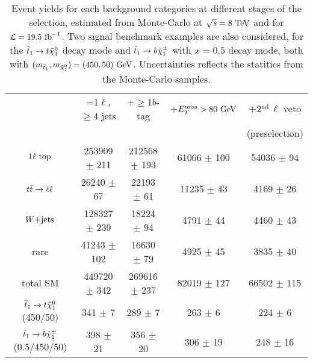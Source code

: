         \begin{table}[h!]
            \hspace*{-0.3cm}
            \begin{tabular}{|c|cccc|}
                \hline
                                             & =1$\ell$, $\geq 4$ jets   & +$\geq 1b$-tag     & +$E_T^\text{miss} > 80 ~\text{GeV}$ &  +2$^\text{nd}\, \ell$ veto \\
                                             &                           &                    &                   & (preselection) \\
                \hline
                $1\ell~\text{top}$              & 253909 $\pm$ 211          & 212568 $\pm$ 193   &  61066 $\pm$ 100  & 54036 $\pm$ 94     \\
                $t\bar{t} \rightarrow \ell \ell$               &  26240 $\pm$ 67           &  22193 $\pm$ 61    &  11235 $\pm$ 43   &  4169 $\pm$ 26     \\
                $\text{$W$+jets}$                     & 128327 $\pm$ 239          &  18224 $\pm$ 94    &   4791 $\pm$ 44   &  4460 $\pm$ 43     \\
                rare                         &  41243 $\pm$ 102          &  16630 $\pm$ 79    &   4925 $\pm$ 45   &  3835 $\pm$ 40     \\
                \hline
                total SM                     & 449720 $\pm$ 342          & 269616 $\pm$ 237   &  82019 $\pm$ 127  & 66502 $\pm$ 115    \\
                \hline
$\tilde{t}_1 \rightarrow t \tilde{\chi}_1^0$   (450/50) & 341 $\pm$ 7               & 289 $\pm$ 7        & 263 $\pm$ 6       & 224 $\pm$ 6        \\
$\tilde{t}_1 \rightarrow b \tilde{\chi}_1^\pm$ (0.5/450/50) & 398 $\pm$ 21              & 356 $\pm$ 20       & 306 $\pm$ 19      & 248 $\pm$ 16       \\
                \hline
            \end{tabular}
            \caption{Event yields for each background categories at different stages of
            the selection, estimated from Monte-Carlo at $\sqrt{s} = 8~\text{TeV}$ and for
            $\mathcal{L} = 19.5~\text{fb}^{-1}$. Two signal benchmark examples are also considered,
            for the $\tilde{t}_1 \rightarrow t \tilde{\chi}_1^0$ decay mode
            and $\tilde{t}_1 \rightarrow b \tilde{\chi}_1^\pm$ with $x = 0.5$ decay mode,
            both with $(m_{\tilde{t}_1},m_{\tilde{\chi}_1^0}) = (450,50)~\text{GeV}$.
            Uncertainties reflects the statitics from the Monte-Carlo samples.}
            \label{tab:cutflowPreselection}
        \end{table}

